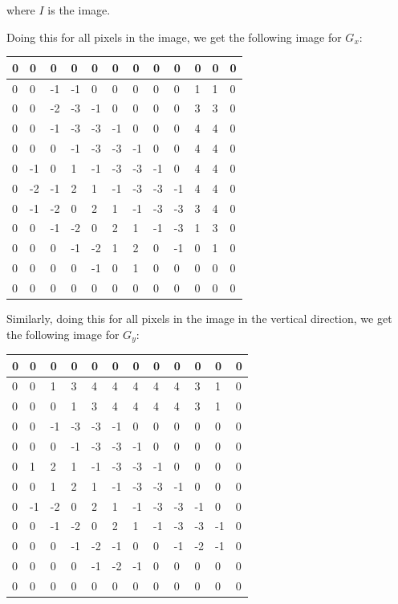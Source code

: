 \documentclass[12pt, letterpaper]{article}
\begin{document}
where $I$ is the image.

Doing this for all pixels in the image, we get the following image for $G_x$:

\begin{table}[H]
    \centering
    \begin{tabular}{|l|l|l|l|l|l|l|l|l|l|l|l|}
    \hline
        0 & 0 & 0 & 0 & 0 & 0 & 0 & 0 & 0 & 0 & 0 & 0  \\ \hline
        0 & 0 & -1 & -1 & 0 & 0 & 0 & 0 & 0 & 1 & 1 & 0  \\ \hline
        0 & 0 & -2 & -3 & -1 & 0 & 0 & 0 & 0 & 3 & 3 & 0  \\ \hline
        0 & 0 & -1 & -3 & -3 & -1 & 0 & 0 & 0 & 4 & 4 & 0  \\ \hline
        0 & 0 & 0 & -1 & -3 & -3 & -1 & 0 & 0 & 4 & 4 & 0  \\ \hline
        0 & -1 & 0 & 1 & -1 & -3 & -3 & -1 & 0 & 4 & 4 & 0  \\ \hline
        0 & -2 & -1 & 2 & 1 & -1 & -3 & -3 & -1 & 4 & 4 & 0  \\ \hline
        0 & -1 & -2 & 0 & 2 & 1 & -1 & -3 & -3 & 3 & 4 & 0  \\ \hline
        0 & 0 & -1 & -2 & 0 & 2 & 1 & -1 & -3 & 1 & 3 & 0  \\ \hline
        0 & 0 & 0 & -1 & -2 & 1 & 2 & 0 & -1 & 0 & 1 & 0  \\ \hline
        0 & 0 & 0 & 0 & -1 & 0 & 1 & 0 & 0 & 0 & 0 & 0  \\ \hline
        0 & 0 & 0 & 0 & 0 & 0 & 0 & 0 & 0 & 0 & 0 & 0 \\ \hline
    \end{tabular}
\end{table}
Similarly, doing this for all pixels in the image in the vertical direction, we get the following image for $G_y$:
\begin{table}[H]
    \centering
    \begin{tabular}{|l|l|l|l|l|l|l|l|l|l|l|l|}
    \hline
        0&0&0&0&0&0&0&0&0&0&0&0 \\ \hline
        0&0&1&3&4&4&4&4&4&3&1&0 \\ \hline
        0&0&0&1&3&4&4&4&4&3&1&0 \\ \hline
        0&0&-1&-3&-3&-1&0&0&0&0&0&0 \\ \hline
        0&0&0&-1&-3&-3&-1&0&0&0&0&0 \\ \hline
        0&1&2&1&-1&-3&-3&-1&0&0&0&0 \\ \hline
        0&0&1&2&1&-1&-3&-3&-1&0&0&0 \\ \hline
        0&-1&-2&0&2&1&-1&-3&-3&-1&0&0 \\ \hline
        0&0&-1&-2&0&2&1&-1&-3&-3&-1&0 \\ \hline
        0&0&0&-1&-2&-1&0&0&-1&-2&-1&0 \\ \hline
        0&0&0&0&-1&-2&-1&0&0&0&0&0 \\ \hline
        0&0&0&0&0&0&0&0&0&0&0&0 \\ \hline
    \end{tabular}
\end{table}
\end{document}
